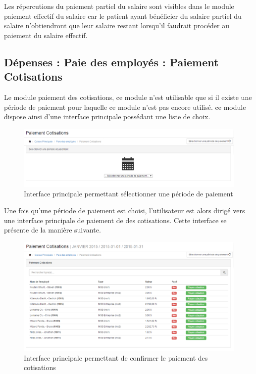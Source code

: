 \documentclass[12pt,a4paper]{report}
\begin{document}
Les répercutions du paiement partiel du salaire sont visibles dans le module paiement effectif du salaire car le patient ayant bénéficier du salaire partiel du salaire n'obtiendront que leur salaire restant lorsqu'il faudrait procéder au paiement du salaire effectif.

\newpage
\subsection{Dépenses : Paie des employés : Paiement Cotisations}
Le module paiement des cotisations, ce module n'est utilisable que si il existe une période de paiement pour laquelle ce module n'est pas encore utilisé. ce module dispose ainsi d'une interface principale possédant une liste de choix.

\begin{figure}[h]
\begin{center}
\includegraphics[width=14cm]{pic/paiemCotisations.png}
\end{center}
\caption{Interface principale permettant sélectionner une période de paiement}
\label{Interface principale permettant sélectionner une période de paiement}
\end{figure}

Une fois qu'une période de paiement est choisi, l'utilisateur est alors dirigé vers une interface principale de paiement de des cotisations. Cette interface se présente de la manière suivante.

\begin{figure}[h]
\begin{center}
\includegraphics[width=14cm]{pic/PaiemCoInterface.png}
\end{center}
\caption{Interface principale permettant de confirmer le paiement des cotisations}
\label{Interface principale permettant de confirmer le paiement des cotisations}
\end{figure}
\end{document}
